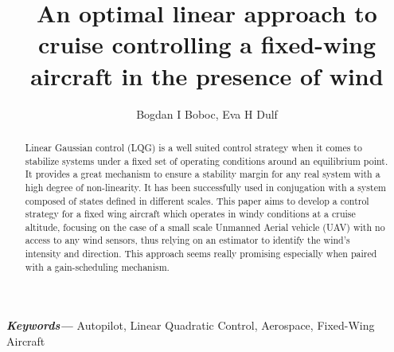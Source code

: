 \documentclass[twocolumn,showpacs,
    nofootinbib,aps,superscriptaddress,
    eqsecnum,prd,showkeys,10pt,floatfix]{revtex4}
\providecommand{\keywords}[1]
{
    \small
    \textbf{\textit{Keywords---}} #1
}
\begin{document}
\begin{titlepage}
    \title{An optimal linear approach to cruise controlling a fixed-wing aircraft in the presence of wind}
    \author{Bogdan I Boboc, Eva H Dulf}

    \begin{abstract}
        Linear Gaussian control (LQG) is a well suited control strategy when it comes to stabilize systems under a fixed set of operating conditions around an equilibrium point.
        It provides a great mechanism to ensure a stability margin for any real system with a high degree of non-linearity.
        It has been successfully used in conjugation with a system composed of states defined in different scales.
        This paper aims to develop a control strategy for a fixed wing aircraft which operates in windy conditions at a cruise altitude, focusing on the case of a small scale Unmanned Aerial vehicle (UAV) with no access to any wind sensors, thus relying on an estimator to identify the wind's intensity and direction.
        This approach seems really promising especially when paired with a gain-scheduling mechanism.
    \end{abstract}
    \keywords{Autopilot, Linear Quadratic Control, Aerospace, Fixed-Wing Aircraft}
    \maketitle
\end{titlepage}
\newpage


\end{document}
